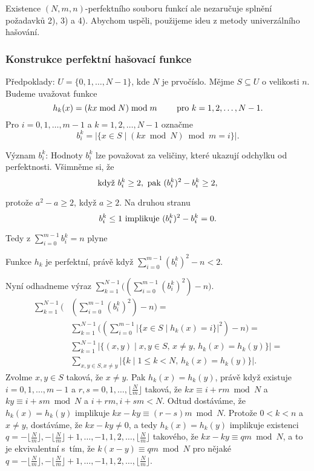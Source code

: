 \documentclass[a4paper,12pt]{article}
\begin{document}
Existence $(N,m,n)$-perfektního souboru funkcí ale 
nezaručuje splnění požadavků 2), 3) a 4).  
Abychom uspěli, použijeme ideu z metody univerzálního 
hašování.  

\subsubsection{Konstrukce perfektní hašovací funkce}

Předpoklady:  $U=\{0,1,\dots,N-1\}$, kde $N$ je 
prvočíslo.  Mějme $S\subseteq U$ o velikosti $n$.  Budeme 
uvažovat funkce 
$$h_k(x)=(kx\bmod N)\bmod m\qquad\text{\rm\ pro }k=1,2,\dots,N-1.$$
Pro $i=0,1,\dots,m-1$ a $k=1,2,\dots,N-1$ označme 
$$b_i^k=|\{x\in S\mid (kx\bmod N)\bmod m=i\}|.$$

Význam $b_i^k$: Hodnoty $b_i^k$ lze považovat za 
veličiny, které ukazují odchylku od perfektnosti. 
Všimněme si, že 
$$\text{\rm když }b_i^k\ge 2,\text{\rm\ pak }(b_i^k)^2-b_i^k\ge 
2,$$

protože $a^2-a\ge 2$, když $a\ge 2$. Na druhou stranu 
$$b_i^k\le 1\text{\rm\ implikuje }(b_i^k)^2-b_i^k=0.$$

Tedy z $\sum_{i=0}^{m-1}b_i^k=n$ plyne 

\begin{veta}Funkce $h_k$ je perfektní, právě když 
$\sum_{i=0}^{m-1}(b_i^k)^2-n<2$.
\end{veta}

Nyní odhadneme výraz $\sum_{k=1}^{N-1}\big((\sum_{
i=0}^{m-1}(b_i^k)^2)-n\big)$.
\begin{align*}\sum_{k=1}^{N-1}\big(&(\sum_{i=0}^{m-1}(b_i^k)^2)-n\big)=\\
&\sum_{k=1}^{N-1}\big((\sum_{i=0}^{m-1}|\{x\in S\mid h_k(x)=i\}|^
2)-n\big)=\\
&\sum_{k=1}^{N-1}|\{(x,y)\mid x,y\in S,\,x\ne y,\,h_k(x)=h_k(y)\}
|=\\
&\sum_{x,y\in S,x\ne y}|\{k\mid 1\le k<N,\,h_k(x)=h_k(y)\}|.\end{align*}
Zvolme $x,y\in S$ taková, že $x\ne y$. Pak $h_k(x)=h_k(y)$, 
právě když existuje $i=0,1,\dots,m-1$ a $r,s=0,1,\dots,\lfloor\frac 
Nm\rfloor$ 
taková, že $kx\equiv i+rm\bmod N$ a $ky\equiv i+sm\bmod N$ a $
i+rm,i+sm<N$. Odtud dostáváme, že $h_k(x)=h_k(y)$ implikuje $
kx-ky\equiv (r-s)m\bmod N$.
Protože $0<k<n$ a $x\ne y$, dostáváme, že $kx-ky\ne 0$, a tedy 
$h_k(x)=h_k(y)$ implikuje existenci 
$q=-\lfloor\frac Nm\rfloor ,-\lfloor\frac Nm\rfloor +1,\dots,-1,1
,2,\dots,\lfloor\frac Nm\rfloor$ takového, že 
$kx-ky\equiv qm\bmod N$,
a to je 
ekvivalentní s~tím, že $k(x-y)\equiv qm\bmod N$ pro nějaké 
$q=-\lfloor\frac Nm\rfloor ,-\lfloor\frac Nm\rfloor +1,\dots,-1,1
,2,\dots,\lfloor\frac Nm\rfloor$.
\end{document}
